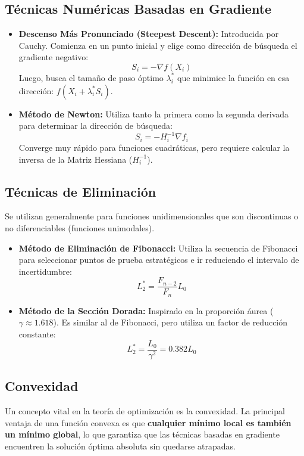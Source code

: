 \documentclass{article}
\begin{document}
	\subsection{Técnicas Numéricas Basadas en Gradiente}
	\begin{itemize}
		\item \textbf{Descenso Más Pronunciado (Steepest Descent):} Introducida por Cauchy. Comienza en un punto inicial y elige como dirección de búsqueda el gradiente negativo: 
		$$S_{i} = -\nabla f(X_{i})$$ 
		Luego, busca el tamaño de paso óptimo $\lambda_{i}^{*}$ que minimice la función en esa dirección: $f(X_{i} + \lambda_{i}^{*} S_{i})$.
		
		\item \textbf{Método de Newton:} Utiliza tanto la primera como la segunda derivada para determinar la dirección de búsqueda:
		$$S_{i} = -H_{i}^{-1} \nabla f_{i}$$
		Converge muy rápido para funciones cuadráticas, pero requiere calcular la inversa de la Matriz Hessiana ($H_{i}^{-1}$).
	\end{itemize}
	
	\subsection{Técnicas de Eliminación}
	Se utilizan generalmente para funciones unidimensionales que son discontinuas o no diferenciables (funciones unimodales).
	
	\begin{itemize}
		\item \textbf{Método de Eliminación de Fibonacci:} Utiliza la secuencia de Fibonacci para seleccionar puntos de prueba estratégicos e ir reduciendo el intervalo de incertidumbre:
		$$L_{2}^{*} = \frac{F_{n-2}}{F_{n}} L_{0}$$
		
		\item \textbf{Método de la Sección Dorada:} Inspirado en la proporción áurea ($\gamma \approx 1.618$). Es similar al de Fibonacci, pero utiliza un factor de reducción constante:
		$$L_{2}^{*} = \frac{L_{0}}{\gamma^{2}} = 0.382 L_{0}$$
	\end{itemize}
	
	\subsection{Convexidad}
	Un concepto vital en la teoría de optimización es la convexidad. La principal ventaja de una función convexa es que \textbf{cualquier mínimo local es también un mínimo global}, lo que garantiza que las técnicas basadas en gradiente encuentren la solución óptima absoluta sin quedarse atrapadas.
	
\end{document}
